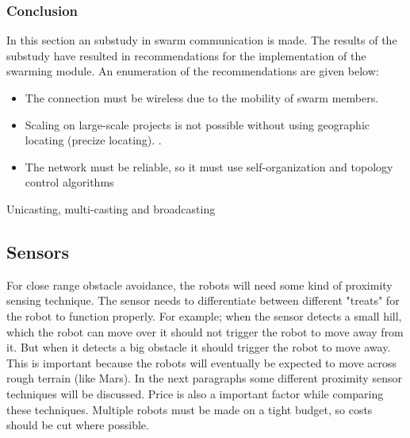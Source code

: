 \documentclass[10pt,a4paper]{article}
\begin{document}
\subsubsection{Conclusion}
In this section an substudy in swarm communication is made. The results of the substudy have resulted in recommendations for the implementation of the swarming module. An enumeration of the recommendations are given below:
\begin{itemize}
\setlength\itemsep{0em}
    \item The connection must be wireless due to the mobility of swarm members.
    \item Scaling on large-scale projects is not possible without using geographic locating (precize locating). \cite{geographicalrouting}\cite{scalablelocation}. 
    \item The network must be reliable, so it must use self-organization and topology control algorithms \cite{WMN1}
\end{itemize}


Unicasting, multi-casting and broadcasting



\newpage



\subsection{Sensors}
For close range obstacle avoidance, the robots will need some kind of proximity sensing technique. The sensor needs to differentiate between different "treats" for the robot to function properly. For example; when the sensor detects a small hill, which the robot can move over it should not trigger the robot to move away from it. But when it detects a big obstacle it should trigger the robot to move away. This is important because the robots will eventually be expected to move across rough terrain (like Mars). In the next paragraphs some different proximity sensor techniques will be discussed. Price is also a important factor while comparing these techniques. Multiple robots must be made on a tight budget, so costs should be cut where possible.\\
\end{document}
